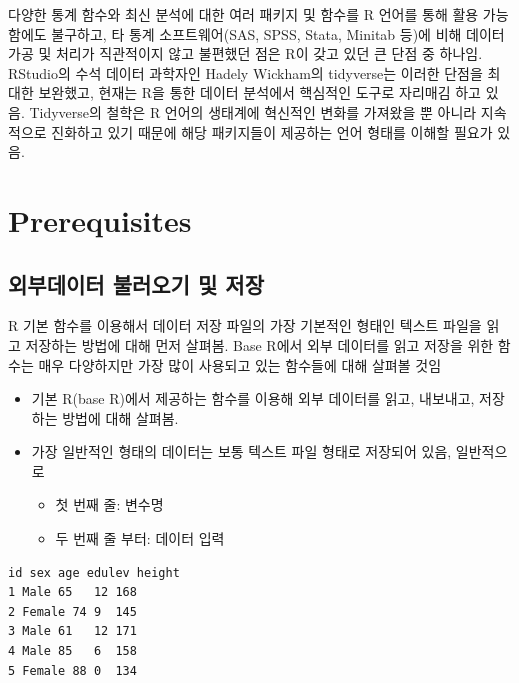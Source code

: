 \documentclass[
  11pt,
]{krantz}
\providecommand{\tightlist}{%
  \setlength{\itemsep}{0pt}\setlength{\parskip}{0pt}}
\let\BeginKnitrBlock\begin \let\EndKnitrBlock\end
\begin{document}
다양한 통계 함수와 최신 분석에 대한 여러 패키지 및 함수를 R 언어를 통해 활용 가능함에도 불구하고, 타 통계 소프트웨어(SAS, SPSS, Stata, Minitab 등)에 비해 데이터 가공 및 처리가 직관적이지 않고 불편했던 점은 R이 갖고 있던 큰 단점 중 하나임. RStudio의 수석 데이터 과학자인 Hadely Wickham의 tidyverse는 이러한 단점을 최대한 보완했고, 현재는 R을 통한 데이터 분석에서 핵심적인 도구로 자리매김 하고 있음. Tidyverse의 철학은 R 언어의 생태계에 혁신적인 변화를 가져왔을 뿐 아니라 지속적으로 진화하고 있기 때문에 해당 패키지들이 제공하는 언어 형태를 이해할 필요가 있음.

\hypertarget{ch4-prerequi}{%
\section{Prerequisites}\label{ch4-prerequi}}

\hypertarget{data-import-export}{%
\subsection{외부데이터 불러오기 및 저장}\label{data-import-export}}

\footnotesize

\BeginKnitrBlock{rmdnote}
R 기본 함수를 이용해서 데이터 저장 파일의 가장 기본적인 형태인 텍스트 파일을 읽고 저장하는 방법에 대해 먼저 살펴봄. Base R에서 외부 데이터를 읽고 저장을 위한 함수는 매우 다양하지만 가장 많이 사용되고 있는 함수들에 대해 살펴볼 것임
\EndKnitrBlock{rmdnote}

\normalsize

\begin{itemize}
\tightlist
\item
  기본 R(base R)에서 제공하는 함수를 이용해 외부 데이터를 읽고, 내보내고, 저장하는 방법에 대해 살펴봄.
\item
  가장 일반적인 형태의 데이터는 보통 텍스트 파일 형태로 저장되어 있음, 일반적으로

  \begin{itemize}
  \tightlist
  \item
    첫 번째 줄: 변수명
  \item
    두 번째 줄 부터: 데이터 입력
  \end{itemize}
\end{itemize}

\begin{verbatim}
id sex age edulev height 
1 Male 65   12 168
2 Female 74 9  145
3 Male 61   12 171
4 Male 85   6  158
5 Female 88 0  134
\end{verbatim}
\end{document}
